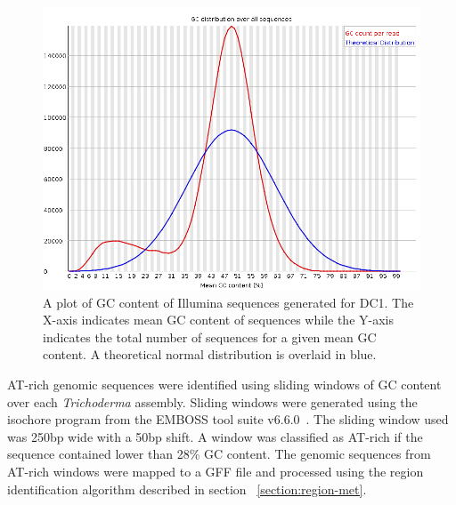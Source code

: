 \begin{figure}
  \centering
  \includegraphics[width=\textwidth]{figures/dc1-low-gc-fastqc.png}
  \caption{A plot of GC content of Illumina sequences generated for
    DC1. The X-axis indicates mean GC content of sequences while the
    Y-axis indicates the total number of sequences for a given mean GC
    content. A theoretical normal distribution is overlaid in blue.}
  \label{fig:dc1-low-gc}
\end{figure}

AT-rich genomic sequences were identified using sliding windows of GC
content over each \textit{Trichoderma} assembly. Sliding windows were
generated using the isochore program from the EMBOSS tool suite
v6.6.0~\cite{rice2000a}. The sliding window used was 250bp wide with a
50bp shift. A window was classified as AT-rich if the sequence
contained lower than 28\% GC content. The genomic sequences from
AT-rich windows were mapped to a GFF file and processed using the
region identification algorithm described in section
~\ref{section:region-met}.



